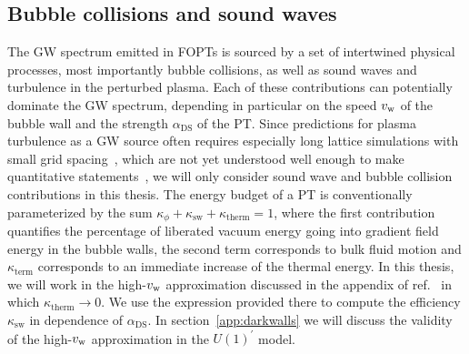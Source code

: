 \subsection{Bubble collisions and sound waves}
\label{sec:bwsw}

The \ac{GW} spectrum emitted in \acp{FOPT} is sourced by a set of intertwined physical processes, most importantly bubble collisions, as well as sound waves and turbulence in the perturbed plasma. Each of these contributions can potentially dominate the \ac{GW} spectrum, depending in particular on the speed $v_\mathrm{w}$ of the bubble wall and the strength $\alpha_\text{DS}$ of the \ac{PT}. Since predictions for plasma turbulence as a \ac{GW} source often requires especially long lattice simulations with small grid spacing~\cite{RoperPol:2019wvy}, which are not yet understood well enough to make  quantitative statements~\cite{Caprini:2019egz}, we will only consider sound wave and bubble collision contributions in this thesis. The energy budget of a \ac{PT} is conventionally parameterized by the sum $\kappa_\phi + \kappa_\text{sw} + \kappa_\text{therm} = 1$, where the first contribution quantifies the percentage of liberated vacuum energy going into gradient field energy in the bubble walls, the second term corresponds to bulk fluid motion and $\kappa_\text{term}$ corresponds to an immediate increase of the thermal energy. In this thesis, we will work in the high-$v_\mathrm{w}$ approximation discussed in the appendix of ref.~\cite{Espinosa:2010hh} in which $\kappa_\text{therm} \rightarrow 0$. We use the expression provided there to compute the efficiency $\kappa_\text{sw}$ in dependence of $\alpha_\text{DS}$. In section~\ref{app:darkwalls} we will discuss the validity of the high-$v_\mathrm{w}$ approximation in the $U(1)^\prime$ model.

